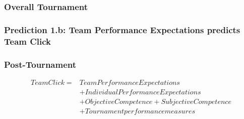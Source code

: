 { \subsubsection{Overall Tournament}




 \subsubsection{Prediction 1.b: Team Performance Expectations predicts Team Click}


 \subsubsection{Post-Tournament}

   \begin{align*}
     Team Click =  & Team Performance Expectations \\
               &+ Individual Performance Expectations \\
               &+ Objective Competence + Subjective Competence \\
               &+ Tournament performance measures \\
   \end{align*}


      


}
